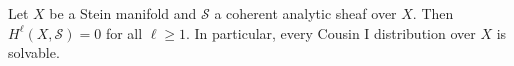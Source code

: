 Let $X$ be a Stein manifold and $\mathcal{S}$ a coherent analytic sheaf over $X$. Then $H^\ell(X, \mathcal{S}) = 0$ for all $\ell \geqslant 1$. In particular, every Cousin I distribution over $X$ is solvable.
